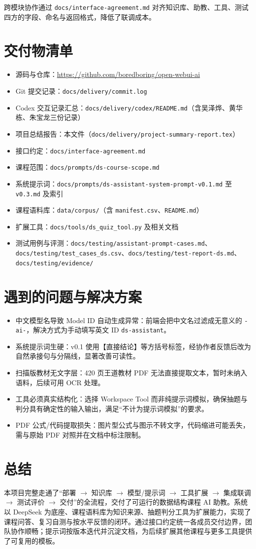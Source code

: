 \documentclass[12pt,a4paper]{ctexart}
\begin{document}
跨模块协作通过 \texttt{docs/interface-agreement.md} 对齐知识库、助教、工具、测试四方的字段、命名与返回格式，降低了联调成本。

\section{交付物清单}

\begin{itemize}
  \item 源码与仓库：\url{https://github.com/boredboring/open-webui-ai}
  \item Git 提交记录：\texttt{docs/delivery/commit.log}
  \item Codex 交互记录汇总：\texttt{docs/delivery/codex/README.md}（含吴泽烨、黄华栋、朱宝龙三份记录）
  \item 项目总结报告：本文件（\texttt{docs/delivery/project-summary-report.tex}）
  \item 接口约定：\texttt{docs/interface-agreement.md}
  \item 课程范围：\texttt{docs/prompts/ds-course-scope.md}
  \item 系统提示词：\texttt{docs/prompts/ds-assistant-system-prompt-v0.1.md} 至 \texttt{v0.3.md} 及索引
  \item 课程语料库：\texttt{data/corpus/}（含 \texttt{manifest.csv}、\texttt{README.md}）
  \item 扩展工具：\texttt{docs/tools/ds\_quiz\_tool.py} 及相关文档
  \item 测试用例与评测：\texttt{docs/testing/assistant-prompt-cases.md}、\texttt{docs/testing/test\_cases\_ds.csv}、\texttt{docs/testing/test-report-ds.md}、\texttt{docs/testing/evidence/}
\end{itemize}

\section{遇到的问题与解决方案}

\begin{itemize}
  \item 中文模型名导致 Model ID 自动生成异常：前端会把中文名过滤成无意义的 \texttt{-ai-}，解决方式为手动填写英文 ID \texttt{ds-assistant}。
  \item 系统提示词生硬：v0.1 使用【直接结论】等方括号标签，经协作者反馈后改为自然承接句与分隔线，显著改善可读性。
  \item 扫描版教材无文字层：420 页王道教材 PDF 无法直接提取文本，暂时未纳入语料，后续可用 OCR 处理。
  \item 工具必须真实结构化：选择 Workspace Tool 而非纯提示词模拟，确保抽题与判分具有确定性的输入输出，满足“不计为提示词模拟”的要求。
  \item PDF 公式/代码提取损失：图片型公式与图示不转文字，代码缩进可能丢失，需与原始 PDF 对照并在文档中标注限制。
\end{itemize}

\section{总结}

本项目完整走通了“部署 $\rightarrow$ 知识库 $\rightarrow$ 模型/提示词 $\rightarrow$ 工具扩展 $\rightarrow$ 集成联调 $\rightarrow$ 测试评价 $\rightarrow$ 交付”的全流程，交付了可运行的数据结构课程 AI 助教。系统以 DeepSeek 为底座、课程语料库为知识来源、抽题判分工具为扩展能力，实现了课程问答、复习自测与按水平反馈的闭环。通过接口约定统一各成员交付边界，团队协作顺畅；提示词按版本迭代并沉淀文档，为后续扩展其他课程与更多工具提供了可复用的模板。
\end{document}
